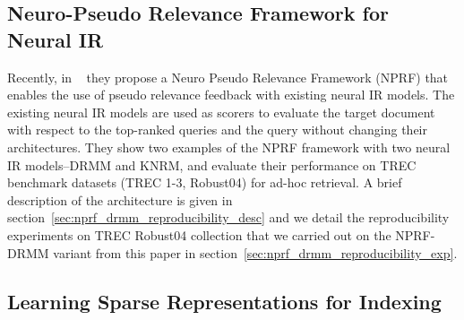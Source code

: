 \subsection{Neuro-Pseudo Relevance Framework for Neural IR}
\label{sec:npr_ir}
Recently, in ~\cite{li2018nprf} they propose a \textsf{Neuro Pseudo Relevance Framework} (NPRF) that enables the use of pseudo relevance feedback with existing neural IR models. The existing neural IR models are used as scorers to evaluate the target document with respect to the top-ranked queries and the query without changing their architectures. They show two examples of the NPRF framework with two neural IR models--DRMM and KNRM, and evaluate their performance on TREC benchmark datasets (TREC 1-3, Robust04) for ad-hoc retrieval. A brief description of the architecture is given in section~\ref{sec:nprf_drmm_reproducibility_desc} and we detail the reproducibility experiments on TREC Robust04 collection that we carried out on the NPRF-DRMM variant from this paper in section~\ref{sec:nprf_drmm_reproducibility_exp}.

\subsection{Learning Sparse Representations for Indexing}

